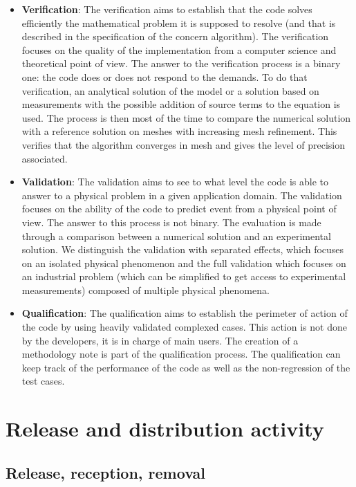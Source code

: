 \begin{itemize}
\item \textbf{Verification}: The verification aims to establish that the code
  solves efficiently the mathematical problem it is supposed to resolve (and
  that is described in the specification of the concern algorithm). The
  verification focuses on the quality of the implementation from a computer
  science and theoretical point of view. The answer to the verification process
  is a binary one: the code does or does not respond to the demands. To do that
  verification, an analytical solution of the model or a solution based on
  measurements with the possible addition of source terms to the equation is
  used. The process is then most of the time to compare the numerical solution
  with a reference solution on meshes with increasing mesh refinement. This
  verifies that the algorithm converges in mesh and gives the level of
  precision associated.
\item \textbf{Validation}: The validation aims to see to what level the code is
  able to answer to a physical problem in a given application domain.  The
  validation focuses on the ability of the code to predict event from a
  physical point of view. The answer to this process is not binary. The
  evaluation is made through a comparison between a numerical solution and an
  experimental solution. We distinguish the validation with separated effects,
  which focuses on an isolated physical phenomenon and the full validation
  which focuses on an industrial problem (which can be simplified to get access
  to experimental measurements) composed of multiple physical phenomena.
\item \textbf{Qualification}: The qualification aims to establish the perimeter
  of action of the code by using heavily validated complexed cases. This action
  is not done by the developers, it is in charge of main users. The creation of
  a methodology note is part of the qualification process. The qualification
  can keep track of the performance of the code as well as the non-regression
  of the test cases.
\end{itemize}

\section{Release and distribution activity}

\subsection{Release, reception, removal}

